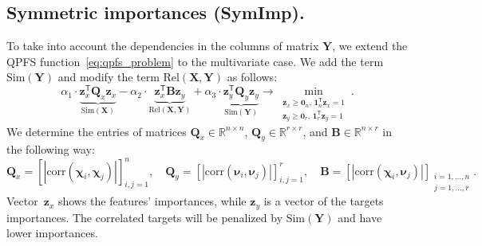 \documentclass[12pt,twoside]{article}
\theoremstyle{definition}
\newcommand{\bz}{\mathbf{z}}
\newcommand{\bY}{\mathbf{Y}}
\newcommand{\bX}{\mathbf{X}}
\newcommand{\bB}{\mathbf{B}}
\newcommand{\bQ}{\mathbf{Q}}
\newcommand{\bbR}{\mathbb{R}}
\newcommand{\T}{\mathsf{T}}
\newcommand{\bchi}{\boldsymbol{\chi}}
\newcommand{\bnu}{\boldsymbol{\nu}}
\newcommand{\bOne}{\boldsymbol{1}}
\newcommand{\bZero}{\boldsymbol{0}}
\begin{document}
\subsection{Symmetric importances (SymImp).}

To take into account the dependencies in the columns of matrix $\bY$, we extend the QPFS function~\eqref{eq:qpfs_problem} to the multivariate case.
We add the term~$\text{Sim}(\bY)$ and modify the term $\text{Rel}(\bX, \bY)$ as follows:
\begin{equation}
\alpha_1 \cdot \underbrace{\bz_x^{\T} \bQ_x \bz_x}_{\text{Sim}(\bX)} - \alpha_2 \cdot \underbrace{\bz_x^{\T} \bB \bz_y}_{\text{Rel}(\bX, \bY)} + \alpha_3 \cdot \underbrace{\bz_y^{\T} \bQ_y \bz_y}_{\text{Sim}(\bY)} \rightarrow \min_{\substack{\bz_x \geq \bZero_n, \, \bOne_n^{\T}\bz_x=1 \\ \bz_y \geq \bZero_r, \, \bOne_r^{\T}\bz_y=1}}.
\label{eq:symimp}
\end{equation}
We determine the entries of matrices $\bQ_x \in \bbR^{n \times n}$, $\bQ_y \in \bbR^{r \times r}$, and $\bB \in \bbR^{n \times r}$ in the following way:
\begin{equation*}
\bQ_x = \left[ |\text{corr}(\bchi_i, \bchi_j)| \right]_{i,j=1}^n, \quad
\bQ_y = \left[ |\text{corr}(\bnu_i, \bnu_j)| \right]_{i,j=1}^r, \quad
\bB =  \left[ |\text{corr}(\bchi_i, \bnu_j)| \right]_{\substack{i=1, \dots, n \\ j=1, \dots, r}}.
\end{equation*}
Vector~$\bz_x$ shows the features' importances, while $\bz_y$ is a vector of the targets importances.
The correlated targets will be penalized by $\text{Sim} (\bY)$ and have lower importances.
\end{document}
